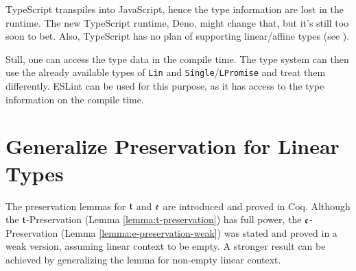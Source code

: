 TypeScript transpiles into JavaScript, hence the type information are lost in the runtime. The new TypeScript runtime, Deno, might change that, but it's still too soon to bet. Also, TypeScript has no plan of supporting linear/affine types (see \cite{typescript-affine}).

Still, one can access the type data in the compile time. The type system can then use the already available types of \texttt{Lin} and \texttt{Single}/\texttt{LPromise} and treat them differently. ESLint can be used for this purpose, as it has access to the type information on the compile time.

\section{Generalize Preservation for Linear Types}

The preservation lemmas for $\mathfrak{t}$ and $\mathfrak{e}$ are introduced and proved in Coq. Although the $\mathfrak{t}$-Preservation (Lemma \ref{lemma:t-preservation}) has full power, the $\mathfrak{e}$-Preservation (Lemma \ref{lemma:e-preservation-weak}) was stated and proved in a weak version, assuming linear context to be empty. A stronger result can be achieved by generalizing the lemma for non-empty linear context.